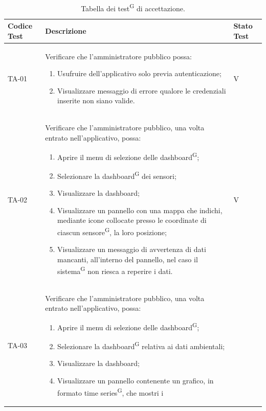 \documentclass[8pt]{article}
\newcommand{\glossterm}[1]{#1\textsuperscript{G}} %
\begin{document}
\renewcommand{\arraystretch}{2.5}
\begin{longtable}{|>{\centering}p{2cm}|>{\RaggedRight}m{12cm}|>{\centering\arraybackslash}p{2cm}|}
    \hline
    \rowcolor{white}
    \textbf{Codice Test} & \textbf{Descrizione} & \textbf{Stato Test} \\
    \hline
    \endfirsthead 
    \rowcolor{white}
    \caption{Tabella dei \glossterm{test} di accettazione.} 
    \label{table:Tabella dei test di accettazione}
    \endlastfoot  
    TA-01 & Verificare che l'amministratore pubblico possa:
    \begin{enumerate}
        \setlength\itemsep{0em}
        \item Usufruire dell’applicativo solo previa autenticazione;
        \item Visualizzare messaggio di errore qualore le credenziali inserite non siano valide.
    \end{enumerate} & V \\
    \hline
    TA-02 & Verificare che l'amministratore pubblico, una volta entrato nell'applicativo, possa:
    \begin{enumerate}
        \setlength\itemsep{0em}
        \item Aprire il menu di selezione delle \glossterm{dashboard};
        \item Selezionare la \glossterm{dashboard} dei sensori;
        \item Visualizzare la dashboard;
        \item Visualizzare un pannello con una mappa che indichi, mediante icone collocate presso le coordinate di ciascun \glossterm{sensore}, la loro posizione;
        \item Visualizzare un messaggio di avvertenza di dati mancanti, all’interno del pannello, nel caso il \glossterm{sistema} non riesca a reperire i dati.
    \end{enumerate}
    & V \\
    \hline
    TA-03 & Verificare che l'amministratore pubblico, una volta entrato nell'applicativo, possa:
    \begin{enumerate}
        \setlength\itemsep{0em}
        \item Aprire il menu di selezione delle \glossterm{dashboard};
        \item Selezionare la \glossterm{dashboard} relativa ai dati ambientali;
        \item Visualizzare la dashboard;
        \item Visualizzare un pannello contenente un grafico, in formato \glossterm{time series}, che mostri i

\end{enumerate}
\end{longtable}
\end{document}
